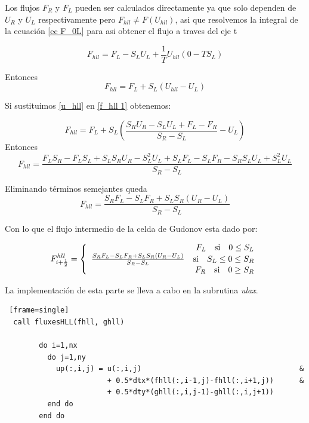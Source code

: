 \documentclass[12pt,a4paper]{book}
\begin{document}
Los flujos $F_R$ y $F_L$ pueden ser calculados directamente ya que solo dependen de $U_R$ y $U_L$ respectivamente pero $F_{hll} \neq F \left( U_{hll} \right)$, asi que resolvemos la integral de la ecuación \ref{ec F_0L} para asi obtener el flujo a traves del eje t

\begin{equation*}
F_{hll} = F_L -S_L U_L+ \frac{1}{T}U_{hll}\left(0- TS_L\right)
\end{equation*}

Entonces
\begin{equation}\label{f_hll 1}
F_{hll} = F_L +S_L \left( U_{hll} -U_L \right)
\end{equation}

Si sustituimos \ref{u_hll} en \ref{f_hll 1} obtenemos:

\begin{equation*}
F_{hll} = F_L +S_L \left( \frac{S_R U_R - S_L U_L + F_L - F_R}{S_R - S_L} -U_L \right)
\end{equation*}
Entonces
\begin{equation*}
F_{hll} = \frac{F_L S_R -F_L S_L+S_L S_R U_R-S_L^2 U_L+S_L  F_L- S_L F_R-S_R S_L U_L + S_L^2 U_L}{S_R-S_L}
\end{equation*}

Eliminando términos semejantes queda
\begin{equation}
F_{hll} = \frac{S_R F_L -S_L F_R + S_L S_R \left(U_R-U_L \right)}{S_R -S_L}
\end{equation}

Con lo que el flujo intermedio de la celda de Gudonov esta dado por:

\begin{equation} \label{fluxesHLL}
F_{i+\frac{1}{2}}^{hll} = 
\left\lbrace
\begin{array}{rr}
F_L \quad \textup{si} \quad 0 \leq S_L  \\
\frac{S_R F_L -S_L F_R + S_L S_R \left(U_R-U_L \right)}{S_R -S_L} \quad \textup{si} \quad S_L \leq 0 \leq S_R \\
F_R \quad \textup{si} \quad  0 \geq  S_R
\end{array}
\right.
\end{equation}

La implementación de esta parte se lleva a cabo en la subrutina \emph{ulax}.

\begin{lstlisting} [frame=single]
  call fluxesHLL(fhll, ghll)
      
        do i=1,nx
          do j=1,ny
            up(:,i,j) = u(:,i,j)                                     &
                        + 0.5*dtx*(fhll(:,i-1,j)-fhll(:,i+1,j))      &
                        + 0.5*dty*(ghll(:,i,j-1)-ghll(:,i,j+1))
          end do
        end do

\end{lstlisting}
\end{document}
